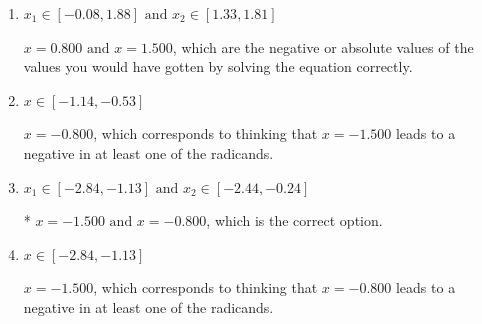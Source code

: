 \documentclass{extbook}[14pt]
\begin{document}
\begin{enumerate}
{\begin{enumerate}[label=\Alph*.]
Corresponds to thinking that $x = -1.500 \text{ and } x = -0.800$ lead to negatives in at least one of the radicands.
\item \( x_1 \in [-0.08, 1.88] \text{ and } x_2 \in [1.33,1.81] \)

$x = 0.800 \text{ and } x = 1.500$, which are the negative or absolute values of the values you would have gotten by solving the equation correctly.
\item \( x \in [-1.14,-0.53] \)

$x = -0.800$, which corresponds to thinking that $x = -1.500$ leads to a negative in at least one of the radicands.
\item \( x_1 \in [-2.84, -1.13] \text{ and } x_2 \in [-2.44,-0.24] \)

* $x = -1.500 \text{ and } x = -0.800$, which is the correct option.
\item \( x \in [-2.84,-1.13] \)

$x = -1.500$, which corresponds to thinking that $x = -0.800$ leads to a negative in at least one of the radicands.
\end{enumerate}

}
\end{enumerate}
\end{document}
